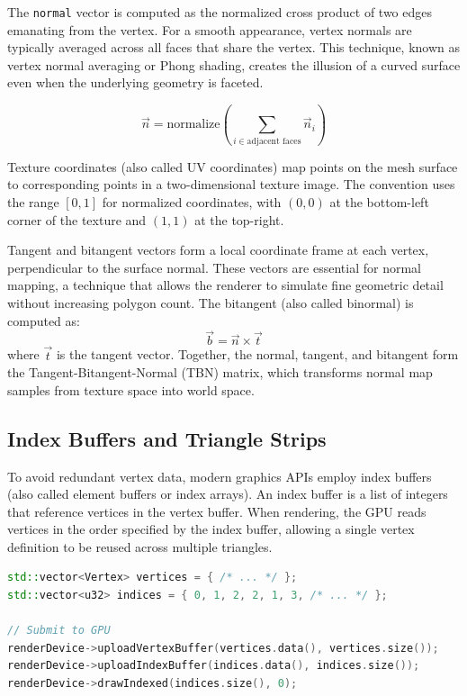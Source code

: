 The \texttt{normal} vector is computed as the normalized cross product of two edges emanating from the vertex. For a smooth appearance, vertex normals are typically averaged across all faces that share the vertex. This technique, known as vertex normal averaging or Phong shading, creates the illusion of a curved surface even when the underlying geometry is faceted.

\begin{equation}
    \vec{n} = \text{normalize}\left( \sum_{i \in \text{adjacent faces}} \vec{n}_i \right)
\end{equation}

Texture coordinates (also called UV coordinates) map points on the mesh surface to corresponding points in a two-dimensional texture image. The convention uses the range $[0, 1]$ for normalized coordinates, with $(0, 0)$ at the bottom-left corner of the texture and $(1, 1)$ at the top-right.

Tangent and bitangent vectors form a local coordinate frame at each vertex, perpendicular to the surface normal. These vectors are essential for normal mapping, a technique that allows the renderer to simulate fine geometric detail without increasing polygon count. The bitangent (also called binormal) is computed as:
\begin{equation}
    \vec{b} = \vec{n} \times \vec{t}
\end{equation}
where $\vec{t}$ is the tangent vector. Together, the normal, tangent, and bitangent form the Tangent-Bitangent-Normal (TBN) matrix, which transforms normal map samples from texture space into world space.

\subsection{Index Buffers and Triangle Strips}

To avoid redundant vertex data, modern graphics APIs employ index buffers (also called element buffers or index arrays). An index buffer is a list of integers that reference vertices in the vertex buffer. When rendering, the GPU reads vertices in the order specified by the index buffer, allowing a single vertex definition to be reused across multiple triangles.

\begin{lstlisting}[language=C++, caption=Indexed Mesh Rendering]
std::vector<Vertex> vertices = { /* ... */ };
std::vector<u32> indices = { 0, 1, 2, 2, 1, 3, /* ... */ };

// Submit to GPU
renderDevice->uploadVertexBuffer(vertices.data(), vertices.size());
renderDevice->uploadIndexBuffer(indices.data(), indices.size());
renderDevice->drawIndexed(indices.size(), 0);
\end{lstlisting}

